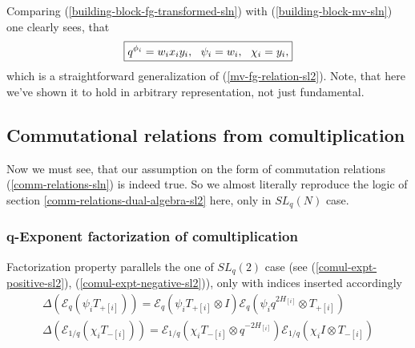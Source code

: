 \documentclass{article}
\newcommand{\lb}{\left (}
\newcommand{\rb}{\right )}
\newcommand{\B}[1]{\lb #1 \rb}
\newcommand{\lsb}{\left [}
\newcommand{\rsb}{\right ]}
\newcommand{\SB}[1]{\lsb #1 \rsb}
\newcommand {\?}{\textit{???}}
\newcommand{\me}[0]{\mathcal{E}}
\newcommand{\Tp}[1][]{T_{+ #1}}
\newcommand{\Tm}[1][]{T_{- #1}}
\newcommand{\leftFactor}[2]{#1[#2] \otimes I}
\newcommand{\rightFactor}[2]{I \otimes #1[#2]}
\newcommand{\leftTwistFactor}[2]{#1[#2] \otimes q^{-2H_{#2}}}
\newcommand{\rightTwistFactor}[2]{q^{2H_{#2}} \otimes #1[#2]}
\newcommand{\comul}[1]{\Delta \lb #1 \rb}
\newcommand{\delabel}[1]{(\ref{#1})}
\begin{document}
Comparing \delabel{building-block-fg-transformed-sln}
with \delabel{building-block-mv-sln} one clearly sees, that
\begin{equation}
  \boxed {
    \label{mv-fg-relation-sln}
    q^{\phi_i} = w_i x_i y_i, \ \ \psi_i = w_i,\ \ \chi_i = y_i,
  }
\end{equation}
which is a straightforward generalization of \delabel{mv-fg-relation-sl2}. Note, that here we've shown it
to hold in arbitrary representation, not just fundamental.

\subsection{Commutational relations from comultiplication}
Now we must see, that our assumption on the form of commutation relations
\delabel{comm-relations-sln} is indeed true.
So we almost literally reproduce the logic of section \ref{comm-relations-dual-algebra-sl2} here,
only in $SL_q(N)$ case.


\subsubsection{q-Exponent factorization of comultiplication}
Factorization property parallels the one of $SL_q(2)$ case
(see \delabel{comul-expt-positive-sl2}, \delabel{comul-expt-negative-sl2}),
only with indices inserted accordingly
\begin{align}
\label{comul-expt-positive-sln}
\comul{\me_q \B{\psi_i \Tp[\SB{i}]}} =
\me_q \B{\psi_i \leftFactor{\Tp}{\SB{i}}}
\me_q \B{\psi_i \rightTwistFactor{\Tp}{\SB{i}}} \\
\label{comul-expt-negative-sln}
\comul{\me_{1/q} \B{\chi_i \Tm[\SB{i}]}} =
\me_{1/q} \B{\chi_i \leftTwistFactor{\Tm}{\SB{i}}}
\me_{1/q} \B{\chi_i \rightFactor{\Tm}{\SB{i}}}
\end{align}
\end{document}
